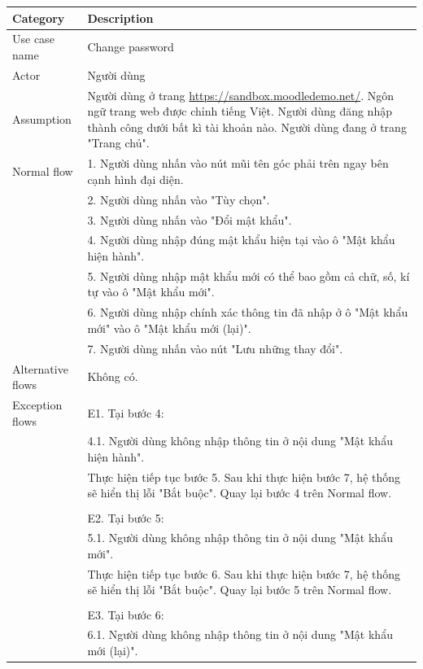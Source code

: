 \documentclass[a4paper, 12pt]{article}
\begin{document}
\begin{table}[H]
    \centering
    \begin{tabular}{|l|p{11cm}|}
        \hline
        Category & Description \\
        \hline
        Use case name & Change password \\
        \hline
        Actor & Người dùng \\
        \hline
        Assumption & Người dùng ở trang \url{https://sandbox.moodledemo.net/}. Ngôn ngữ trang web được chỉnh tiếng Việt. Người dùng đăng nhập thành công dưới bất kì tài khoản nào. Người dùng đang ở trang "Trang chủ". \\
        \hline
        Normal flow & 1. Người dùng nhấn vào nút mũi tên góc phải trên ngay bên cạnh hình đại diện. \\
        & 2. Người dùng nhấn vào "Tùy chọn". \\
        & 3. Người dùng nhấn vào "Đổi mật khẩu". \\
        & 4. Người dùng nhập đúng mật khẩu hiện tại vào ô "Mật khẩu hiện hành".\\
        & 5. Người dùng nhập mật khẩu mới có thể bao gồm cả chữ, số, kí tự vào ô "Mật khẩu mới".\\
        & 6. Người dùng nhập chính xác thông tin đã nhập ở ô "Mật khẩu mới" vào ô "Mật khẩu mới (lại)".\\
        & 7. Người dùng nhấn vào nút "Lưu những thay đổi". \\
        \hline
        Alternative flows & Không có. \\
        \hline
        Exception flows & E1. Tại bước 4: \\
        & 4.1. Người dùng không nhập thông tin ở nội dung "Mật khẩu hiện hành". \\ 
        & Thực hiện tiếp tục bước 5. Sau khi thực hiện bước 7, hệ thống sẽ hiển thị lỗi "Bắt buộc". Quay lại bước 4 trên Normal flow. \\
        & \\
        & E2. Tại bước 5: \\
        & 5.1. Người dùng không nhập thông tin ở nội dung "Mật khẩu mới". \\
        & Thực hiện tiếp tục bước 6. Sau khi thực hiện bước 7, hệ thống sẽ hiển thị lỗi "Bắt buộc". Quay lại bước 5 trên Normal flow. \\
        & \\
        & E3. Tại bước 6: \\
        & 6.1. Người dùng không nhập thông tin ở nội dung "Mật khẩu mới (lại)". \\

\end{tabular}
\end{table}
\end{document}
